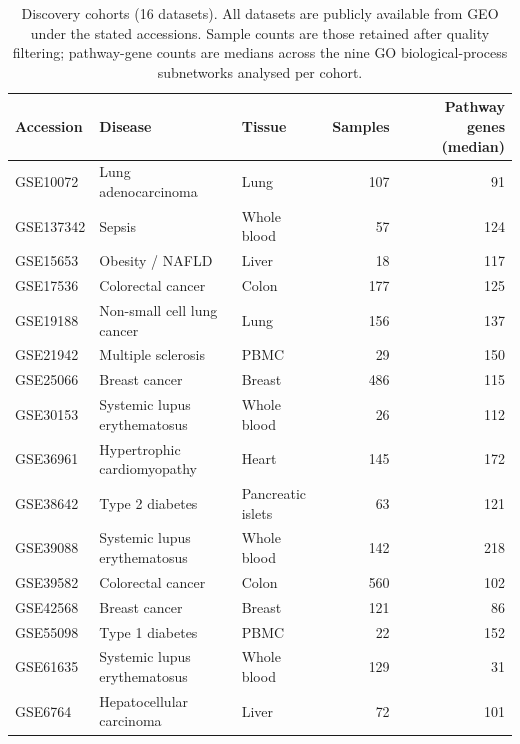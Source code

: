 \documentclass[twocolumn,10pt,a4paper]{article}
\begin{document}
\begin{table}[t]
\centering
\caption{Discovery cohorts (16 datasets). All datasets are publicly available from GEO
under the stated accessions. Sample counts are those retained after quality filtering;
pathway-gene counts are medians across the nine GO biological-process subnetworks
analysed per cohort.}
\label{tab:datasets}
\small
\begin{tabular}{lllrr}
\toprule
Accession & Disease & Tissue & Samples & Pathway genes (median) \\
\midrule
GSE10072 & Lung adenocarcinoma & Lung & 107 & 91 \\
GSE137342 & Sepsis & Whole blood & 57 & 124 \\
GSE15653 & Obesity / NAFLD & Liver & 18 & 117 \\
GSE17536 & Colorectal cancer & Colon & 177 & 125 \\
GSE19188 & Non-small cell lung cancer & Lung & 156 & 137 \\
GSE21942 & Multiple sclerosis & PBMC & 29 & 150 \\
GSE25066 & Breast cancer & Breast & 486 & 115 \\
GSE30153 & Systemic lupus erythematosus & Whole blood & 26 & 112 \\
GSE36961 & Hypertrophic cardiomyopathy & Heart & 145 & 172 \\
GSE38642 & Type 2 diabetes & Pancreatic islets & 63 & 121 \\
GSE39088 & Systemic lupus erythematosus & Whole blood & 142 & 218 \\
GSE39582 & Colorectal cancer & Colon & 560 & 102 \\
GSE42568 & Breast cancer & Breast & 121 & 86 \\
GSE55098 & Type 1 diabetes & PBMC & 22 & 152 \\
GSE61635 & Systemic lupus erythematosus & Whole blood & 129 & 31 \\
GSE6764 & Hepatocellular carcinoma & Liver & 72 & 101 \\
\bottomrule
\end{tabular}
\end{table}
\end{document}
